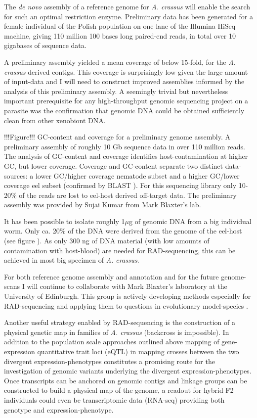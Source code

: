 \documentclass[10pt]{article}
\begin{document}
The \textit{de novo} assembly of a reference genome for
\textit{A. crassus} will enable the search for such an optimal
restriction enzyme. Preliminary data has been generated for a female
individual of the Polish population on one lane of the Illumina HiSeq
machine, giving 110 million 100 bases long paired-end reads, in total
over 10 gigabases of sequence data.

A preliminary assembly yielded a mean coverage of below 15-fold, for
the \textit{A. crassus} derived contigs. This coverage is surprisingly
low given the large amount of input-data and I will need to construct
improved assemblies informed by the analysis of this preliminary
assembly. A seemingly trivial but nevertheless important prerequisite
for any high-throughput genomic sequencing project on a parasite was
the confirmation that genomic DNA could be obtained sufficiently clean
from other xenobiont DNA.

!!!Figure!!! GC-content and coverage for a preliminary genome
assembly. A preliminary assembly of roughly 10 Gb sequence data in
over 110 million reads. The analysis of GC-content and coverage
identifies host-contamination at higher GC, but lower
coverage. Coverage and GC-content separate two distinct data-sources:
a lower GC/higher coverage nematode subset and a higher GC/lower
coverage eel subset (confirmed by BLAST \cite{pmid2231712}). For this
sequencing library only 10-20\% of the reads are lost to eel-host
derived off-target data. The preliminary assembly was provided by
Sujai Kumar from Mark Blaxter's lab.

It has been possible to isolate roughly 1$\mu$g of genomic DNA from a
big individual worm. Only ca. 20\% of the DNA were derived from the
genome of the eel-host (see figure ). As only 300
ng of DNA material (with low amounts of contamination with host-blood)
are needed for RAD-sequencing, this can be achieved in most big
specimen of \textit{A. crassus}.

For both reference genome assembly and annotation and for the future
genome-scans I will continue to collaborate with Mark Blaxter's
laboratory at the University of Edinburgh. This group is actively
developing methods especially for RAD-sequencing and applying them to
questions in evolutionary model-species \cite{pmid21681211}.

Another useful strategy enabled by RAD-sequencing is the construction
of a physical genetic map in families of \textit{A. crassus}
(backcross is impossible). In addition to the population scale
approaches outlined above mapping of gene-expression quantitative
trait loci (eQTL) in mapping crosses between the two divergent
expression-phenotypes constitutes a promising route for the
investigation of genomic variants underlying the divergent
expression-phenotypes. Once transcripts can be anchored on genomic
contigs and linkage groups can be constructed to build a physical map
of the genome, a readout for hybrid F2 individuals could even be
transcriptomic data (RNA-seq) providing both genotype and
expression-phenotype.
\end{document}
